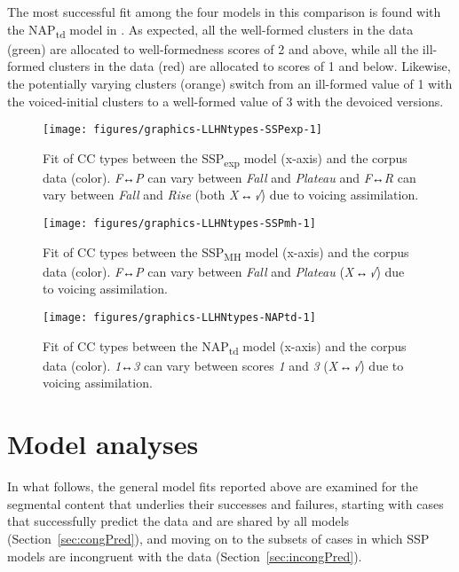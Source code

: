 The most successful fit among the four models in this comparison is found with the NAP\textsubscript{td} model in . As expected, all the well-formed clusters in the data (green) are allocated to well-formedness scores of 2 and above, while all the ill-formed clusters in the data (red) are allocated to scores of 1 and below. Likewise, the potentially varying clusters (orange) switch from an ill-formed value of 1 with the voiced-initial clusters to a well-formed value of 3 with the devoiced versions.

\begin{figure}
\texttt{[image: figures/graphics-LLHNtypes-SSPexp-1]} 
\caption{Fit of CC types between the SSP\textsubscript{exp} model (x-axis) and the corpus data (color). \emph{F↔P} can vary between \emph{Fall} and \emph{Plateau} and \emph{F↔R} can vary between \emph{Fall} and \emph{Rise} %
(both \emph{X\,↔\,√}) due to voicing assimilation.}\label{fig:LLHNtypes-SSPexp}
\end{figure}

\begin{figure}
\texttt{[image: figures/graphics-LLHNtypes-SSPmh-1]}
\caption{Fit of CC types between the SSP\textsubscript{MH} model (x-axis) and the corpus data (color). \emph{F↔P} can vary between \emph{Fall} and \emph{Plateau} %
(\emph{X\,↔\,√}) due to voicing assimilation.}\label{fig:LLHNtypes-SSPmh}
\end{figure}

\begin{figure}
\texttt{[image: figures/graphics-LLHNtypes-NAPtd-1]} 
\caption{Fit of CC types between the NAP\textsubscript{td} model (x-axis) and the corpus data (color). \emph{1↔3} can vary between scores \emph{1} and \emph{3} %
(\emph{X\,↔\,√}) due to voicing assimilation.}\label{fig:LLHNtypes-NAPtd}
\end{figure}

\section{Model analyses}\label{sec:mAnal}

In what follows, the general model fits reported above are examined for the segmental content that underlies their successes and failures, starting with cases that successfully predict the data and are shared by all models (Section~\ref{sec:congPred}), and moving on to the subsets of cases in which SSP models are incongruent with the data (Section~\ref{sec:incongPred}).


